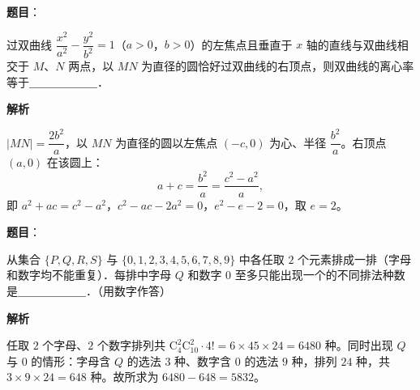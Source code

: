 \begin{answer}

\textbf{题目}：

过双曲线 $\dfrac{x^2}{a^2} - \dfrac{y^2}{b^2} = 1$（$a > 0$，$b > 0$）的左焦点且垂直于 $x$ 轴的直线与双曲线相交于 $M$、$N$ 两点，以 $MN$ 为直径的圆恰好过双曲线的右顶点，则双曲线的离心率等于＿＿＿＿＿＿．

\textbf{解析}

$|MN| = \dfrac{2b^2}{a}$，以 $MN$ 为直径的圆以左焦点 $(-c, 0)$ 为心、半径 $\dfrac{b^2}{a}$。右顶点 $(a, 0)$ 在该圆上：
\nopagebreak[4]
\[
a + c = \frac{b^2}{a} = \frac{c^2 - a^2}{a},
\]
即 $a^2 + ac = c^2 - a^2$，$c^2 - ac - 2a^2 = 0$，$e^2 - e - 2 = 0$，取 $e = 2$。


\end{answer}
\begin{answer}

\textbf{题目}：

从集合 $\{P, Q, R, S\}$ 与 $\{0, 1, 2, 3, 4, 5, 6, 7, 8, 9\}$ 中各任取 $2$ 个元素排成一排（字母和数字均不能重复）．每排中字母 $Q$ 和数字 $0$ 至多只能出现一个的不同排法种数是＿＿＿＿＿＿．（用数字作答）

\textbf{解析}

任取 $2$ 个字母、$2$ 个数字排列共 $\mathrm{C}_4^2\mathrm{C}_{10}^2\cdot 4! = 6 \times 45 \times 24 = 6480$ 种。同时出现 $Q$ 与 $0$ 的情形：字母含 $Q$ 的选法 $3$ 种、数字含 $0$ 的选法 $9$ 种，排列 $24$ 种，共 $3 \times 9 \times 24 = 648$ 种。故所求为 $6480 - 648 = 5832$。


\end{answer}
